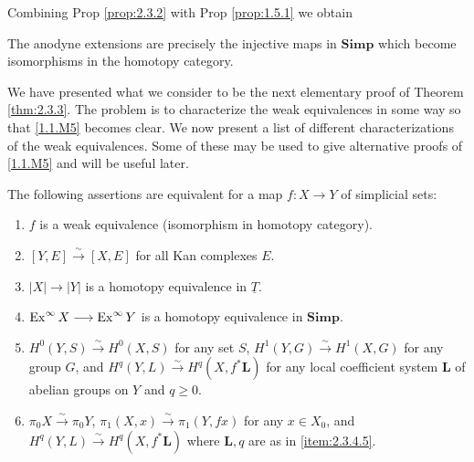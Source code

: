 \documentclass[../main]{subfiles}
\begin{document}
Combining Prop \ref{prop:2.3.2} with Prop \ref{prop:1.5.1} we obtain 

\begin{corollary*}
The anodyne extensions are precisely the injective maps in $\mathbf{Simp}$ which become isomorphisms in the homotopy category. 
\end{corollary*}

\begin{remark*}
We have presented what we consider to be the next elementary proof of Theorem \ref{thm:2.3.3}. The problem is to characterize the weak equivalences in some way so that \ref{1.1.M5} becomes clear. We now present a list of different characterizations of the weak equivalences. Some of these may be used to give alternative proofs of \ref{1.1.M5} and will be useful later.
\end{remark*}

\begin{proposition}\label{prop:2.3.5}
The following assertions are equivalent for a map $f \colon X \longrightarrow Y$ of simplicial sets:

\begin{enumerate}[label=(\roman*)]
    \item \label{item:2.3.4.1} $f$ is a weak equivalence (isomorphism in homotopy category).
    \item \label{item:2.3.4.2} $[Y, E] \xrightarrow{\sim} [X, E]$ for all Kan complexes $E$. 
    \item \label{item:2.3.4.3} $|X| \longrightarrow |Y|$ is a homotopy equivalence in $\underline T$.
    \item \label{item:2.3.4.4} $\operatorname{Ex}^{\infty} X \longrightarrow \operatorname{Ex}^{\infty} Y$ is a homotopy equivalence in $\mathbf{Simp}$.
    \item \label{item:2.3.4.5}$H^{0} (Y, S) \xrightarrow{\sim} H^{0} (X, S)$ for any set $S$, $H^{1} (Y, G) \xrightarrow{\sim} H^{1} (X, G)$ for any group $G$, and $H^{q} (Y, L) \xrightarrow{\sim} H^{q} (X, f^{\ast } \mathbf{L})$ for any local coefficient system $\mathbf{L}$ of abelian groups on $Y$ and $q \geq 0$.
    \item \label{item:2.3.4.6} $\pi_{0} X \xrightarrow{\sim} \pi_0 Y$, $\pi_{1} (X, x) \xrightarrow{\sim} \pi_1 (Y, fx)$ for any $x \in X_0$, and \\$H^{q} (Y, L) \xrightarrow{\sim} H^{q} (X, f^{\ast } \mathbf{L})$ where $\mathbf{L}, q$ are as in \ref{item:2.3.4.5}. %
\end{enumerate}
\end{proposition}
\end{document}
